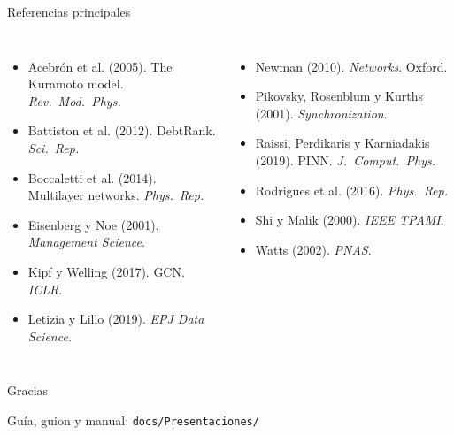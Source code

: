 \documentclass[aspectratio=169,10pt]{beamer}
\begin{document}
\begin{frame}{Referencias principales}
\scriptsize
\begin{columns}[T]
\begin{itemize}
\item Acebrón et al. (2005). The Kuramoto model. \emph{Rev.\ Mod.\ Phys.}
\item Battiston et al. (2012). DebtRank. \emph{Sci.\ Rep.}
\item Boccaletti et al. (2014). Multilayer networks. \emph{Phys.\ Rep.}
\item Eisenberg y Noe (2001). \emph{Management Science}.
\item Kipf y Welling (2017). GCN. \emph{ICLR}.
\item Letizia y Lillo (2019). \emph{EPJ Data Science}.
\end{itemize}
\begin{itemize}
\item Newman (2010). \emph{Networks}. Oxford.
\item Pikovsky, Rosenblum y Kurths (2001). \emph{Synchronization}.
\item Raissi, Perdikaris y Karniadakis (2019). PINN. \emph{J.\ Comput.\ Phys.}
\item Rodrigues et al. (2016). \emph{Phys.\ Rep.}
\item Shi y Malik (2000). \emph{IEEE TPAMI}.
\item Watts (2002). \emph{PNAS}.
\end{itemize}
\end{columns}
\end{frame}

\begin{frame}[standout]
Gracias

\vspace{0.4cm}
\normalsize Guía, guion y manual: \texttt{docs/Presentaciones/}
\end{frame}
\end{document}
